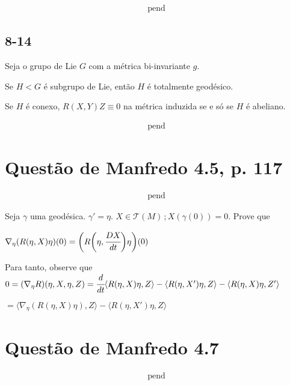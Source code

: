 \documentclass[10pt,a4paper]{article}
\begin{document}
		\begin{align}
		\text{pend}
		\end{align}

		\subsection{8-14}
		\begin{flushright}
		\end{flushright}

		Seja o grupo de Lie $G$ com a m\'etrica bi-invariante $g$.

		Se $H < G$ \'e subgrupo de Lie, ent\~ao $H$ \'e totalmente geod\'esico.

		Se $H$ \'e conexo, $R(X,Y)Z \equiv 0$ na m\'etrica induzida se e s\'o se $H$ \'e abeliano.

		\begin{align}
		\text{pend}
		\end{align}

	\section{Quest\~ao de Manfredo 4.5, p. 117}
		\begin{flushright}
		\end{flushright}

		\begin{align}
		\text{pend}
		\end{align}

		Seja $\gamma$ uma geod\'esica. $\gamma' = \eta$. $X \in \mathcal{T}(M) \,; X(\gamma(0)) = 0$. Prove que

		$\nabla_\eta ( R(\eta, X)\eta )(0) = \bigg( R\bigg(\eta, \cfrac{DX}{dt}\bigg) \eta \bigg) (0) $

		Para tanto, observe que $0 = (\nabla_\eta R)(\eta, X, \eta, Z) = \cfrac{d}{dt} \langle R(\eta, X)\eta, Z \rangle - \langle R(\eta, X')\eta, Z \rangle - \langle R(\eta, X)\eta, Z' \rangle$

		$= \langle \nabla_\eta ( R(\eta, X)\eta ), Z \rangle - \langle R(\eta, X')\eta, Z \rangle$

	\section{Quest\~ao de Manfredo 4.7}
		\begin{flushright}
		\end{flushright}

		\begin{align}
		\text{pend}
		\end{align}
\end{document}
